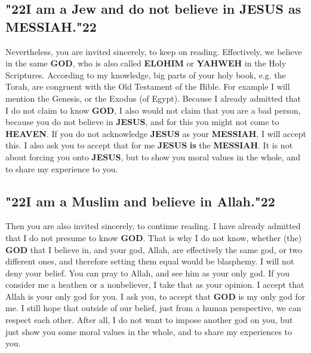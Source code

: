 \documentclass[12pt,a4paper]{article}
\newcommand{\God}[0]{\textbf{GOD}}
\newcommand{\Elohim}[0]{\textbf{ELOHIM}}
\newcommand{\Heaven}[0]{\textbf{HEAVEN}}
\newcommand{\Jesus}[0]{\textbf{JESUS}}
\newcommand{\Messiah}[0]{\textbf{MESSIAH}}
\newcommand{\Yahweh}[0]{\textbf{YAHWEH}}
\newcommand{\q}[1]{\char"22{#1}\char"22 }
\begin{document}
	\subsection{\q{I am a Jew and do not believe in {\Jesus} as {\Messiah}.}}
		Nevertheless,
		you are invited sincerely,
		to keep on reading.
		Effectively,
		we believe in the same {\God},
		who is also called {\Elohim} or {\Yahweh} in the Holy Scriptures.
		According to my knowledge,
		big parts of your holy book,
		e.g. the Torah,
		are congruent with the Old Testament of the Bible.
		For example I will mention the Genesis,
		or the Exodus (of Egypt).
		Because I already admitted that I do not claim to know {\God},
		I also would not claim that you are a bad person,
		because you do not believe in {\Jesus},
		and for this you might not come to {\Heaven}.
		If you do not acknowledge {\Jesus} as your {\Messiah},
		I will accept this.
		I also ask you to accept that for me {\Jesus} \textbf{is} the {\Messiah}.
		It is not about forcing you onto {\Jesus},
		but to show you moral values in the whole,
		and to share my experience to you.
		
	\subsection{\q{I am a Muslim and believe in Allah.}}
		Then you are also invited sincerely,
		to continue reading.
		I have already admitted
		that I do not presume to know {\God}.
		That is why I do not know,
		whether (the) {\God} that I believe in,
		and your god,
		Allah,
		are effectively the same god,
		or two different ones,
		and therefore setting them equal would be blasphemy.
		I will not deny your belief.
		You can pray to Allah,
		and see him as your only god.
		If you consider me a heathen or a nonbeliever,
		I take that as your opinion.
		I accept that Allah is your only god for you.
		I ask you,
		to accept that {\God} is my only god for me.
		I still hope that outside of our belief,
		just from a human perspective,
		we can respect each other.
		After all,
		I do not want to impose another god on you,
		but just show you some moral values in the whole,
		and to share my experiences to you.
	
\end{document}
